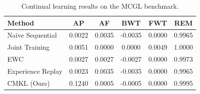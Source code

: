 \begin{table}[ht]
\centering
\caption{Continual learning results on the MCGL benchmark.}
\label{tab:main_results}
\begin{tabular}{lccccc}
\toprule
\textbf{Method} & \textbf{AP} & \textbf{AF} & \textbf{BWT} & \textbf{FWT} & \textbf{REM} \\
\midrule
Naive Sequential & 0.0022 & 0.0035 & -0.0035 & 0.0000 & 0.9965 \\
Joint Training & 0.0051 & 0.0000 & 0.0000 & 0.0049 & 1.0000 \\
EWC & 0.0027 & 0.0027 & -0.0027 & 0.0000 & 0.9973 \\
Experience Replay & 0.0023 & 0.0035 & -0.0035 & 0.0000 & 0.9965 \\
CMKL (Ours) & 0.1240 & 0.0005 & -0.0005 & 0.0000 & 0.9995 \\
\bottomrule
\end{tabular}
\end{table}